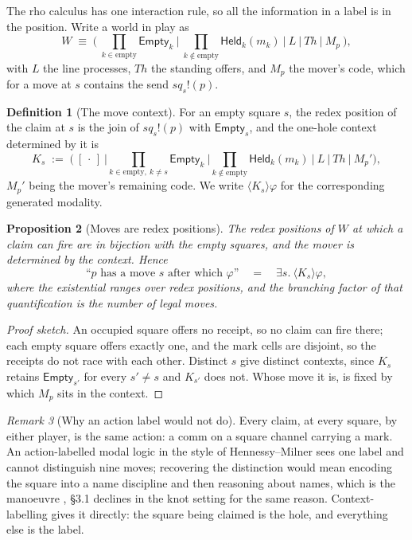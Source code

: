 \documentclass[11pt]{article}
\theoremstyle{definition}
\newtheorem{definition}{Definition}
\theoremstyle{plain}
\newtheorem{proposition}[definition]{Proposition}
\theoremstyle{remark}
\newtheorem{remark}[definition]{Remark}
\begin{document}
The rho calculus has one interaction rule, so all the information in a label is
in the position. Write a world in play as
\[
W \;\equiv\; \Big(\ \prod_{k \in \mathrm{empty}} \mathsf{Empty}_k
\ \Big|\ \prod_{k \notin \mathrm{empty}} \mathsf{Held}_k(m_k)
\ \Big|\ L \ \Big|\ \mathit{Th} \ \Big|\ M_p \ \Big),
\]
with $L$ the line processes, $\mathit{Th}$ the standing offers, and $M_p$ the
mover's code, which for a move at $s$ contains the send $\mathit{sq}_s!(p)$.

\begin{definition}[The move context]\label{def:K}
For an empty square $s$, the redex position of the claim at $s$ is the join of
$\mathit{sq}_s!(p)$ with $\mathsf{Empty}_s$, and the one-hole context
determined by it is
\[
K_s \;:=\; \Big(\ [\,\cdot\,]\ \Big|
\prod_{k \in \mathrm{empty},\ k \neq s}\!\! \mathsf{Empty}_k \ \Big|
\prod_{k \notin \mathrm{empty}}\!\! \mathsf{Held}_k(m_k) \ \Big| \ L \ \Big|\
\mathit{Th} \ \Big| \ M_p' \Big) ,
\]
$M_p'$ being the mover's remaining code. We write $\langle K_s\rangle\varphi$
for the corresponding generated modality.
\end{definition}

\begin{proposition}[Moves are redex positions]\label{prop:moves}
The redex positions of $W$ at which a claim can fire are in bijection with the
empty squares, and the mover is determined by the context. Hence
\[
\text{``$p$ has a move $s$ after which $\varphi$''}
\quad=\quad
\exists s.\ \langle K_s \rangle \varphi ,
\]
where the existential ranges over redex positions, and the branching factor of
that quantification is the number of legal moves.
\end{proposition}
\begin{proof}[Proof sketch]
An occupied square offers no receipt, so no claim can fire there; each empty
square offers exactly one, and the mark cells are disjoint, so the receipts do
not race with each other. Distinct $s$ give distinct contexts, since $K_s$
retains $\mathsf{Empty}_{s'}$ for every $s' \neq s$ and $K_{s'}$ does not.
Whose move it is, is fixed by which $M_p$ sits in the context.
\end{proof}

\begin{remark}[Why an action label would not do]
Every claim, at every square, by either player, is the same action: a comm on a
square channel carrying a mark. An action-labelled modal logic in the style of
Hennessy--Milner sees one label and cannot distinguish nine moves; recovering
the distinction would mean encoding the square into a name discipline and then
reasoning about names, which is the manoeuvre \cite{classifier}, \S3.1 declines
in the knot setting for the same reason. Context-labelling gives it directly:
the square being claimed is the hole, and everything else is the label.
\end{remark}
\end{document}

